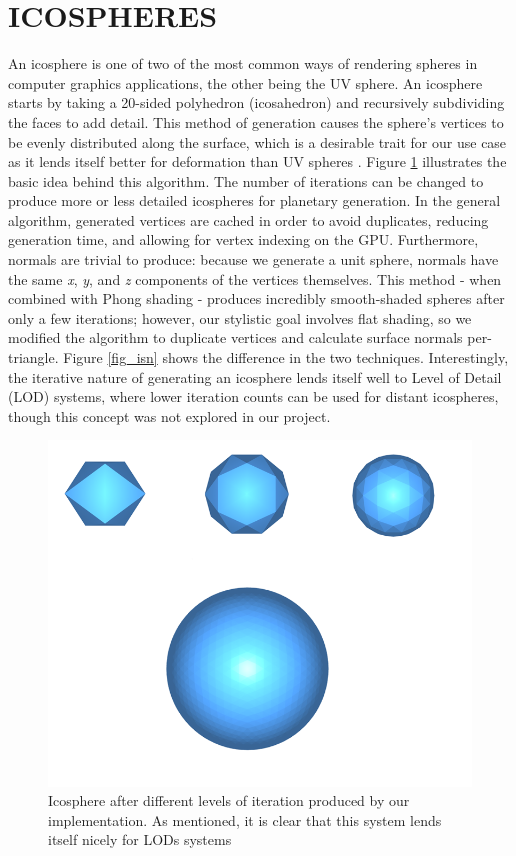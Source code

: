 \documentclass[a4paper,twoside]{article}
\begin{document}
\section{\uppercase{IcoSpheres}}
\label{sec:icosphere}
\noindent An icosphere is one of two of the most common ways of rendering spheres in computer graphics applications, the other being the UV sphere. An icosphere starts by taking a 20-sided polyhedron (icosahedron)  and recursively subdividing the faces to add detail. This method of generation causes the sphere's vertices to be evenly distributed along the surface, which is a desirable trait for our use case as it lends itself better for deformation than UV spheres \cite{pnoise}. Figure \ref{fig_isa} illustrates the basic idea behind this algorithm. The number of iterations can be changed to produce more or less detailed icospheres for planetary generation.
In the general algorithm, generated vertices are cached in order to avoid duplicates, reducing generation time, and allowing for vertex indexing on the GPU. Furthermore, normals are trivial to produce: because we generate a unit sphere, normals have the same \textit{x}, \textit{y}, and \textit{z} components of the vertices themselves. This method - when combined with Phong shading - produces incredibly smooth-shaded spheres after only a few iterations; however, our stylistic goal involves flat shading, so we modified the algorithm to duplicate vertices and calculate surface normals per-triangle. Figure \ref{fig_isn} shows the difference in the two techniques. Interestingly, the iterative nature of generating an icosphere lends itself well to Level of Detail (LOD) systems, where lower iteration counts can be used for distant icospheres, though this concept was not explored in our project.

\begin{figure}
\includegraphics[scale=0.24]{./images/icospheres/icosphereslod.png}
\caption{Icosphere after different levels of iteration produced by our implementation. As mentioned, it is clear that this system lends itself nicely for LODs systems}
\label{fig_isa}
\end{figure}
\end{document}
